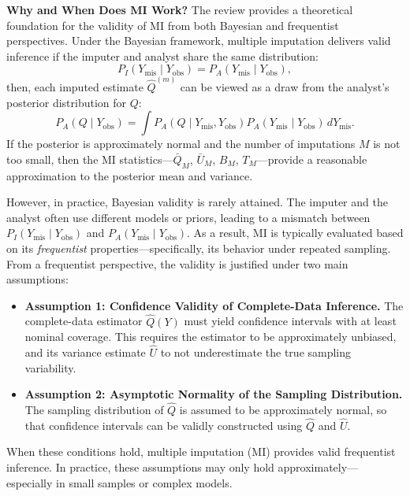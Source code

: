 \documentclass[12pt,oneside]{amsart}
\theoremstyle{definition}
\theoremstyle{remark}
\numberwithin{equation}{section}
\begin{document}
\textbf{Why and When Does MI Work?}  
The review provides a theoretical foundation for the validity of MI from both Bayesian and frequentist perspectives. Under the Bayesian framework, multiple imputation delivers valid inference if the imputer and analyst share the same distribution:
$$
P_I(Y_{\text{mis}} \mid Y_{\text{obs}}) = P_A(Y_{\text{mis}} \mid Y_{\text{obs}}),
$$
then, each imputed estimate $\hat{Q}^{(m)}$ can be viewed as a draw from the analyst’s posterior distribution for $Q$: $$
P_A(Q \mid Y_{\text{obs}}) = \int P_A(Q \mid Y_{\text{mis}}, Y_{\text{obs}}) P_A(Y_{\text{mis}} \mid Y_{\text{obs}}) \, dY_{\text{mis}}. 
$$
If the posterior is approximately normal and the number of imputations $M$ is not too small, then the MI statistics—$\bar{Q}_M$, $\bar{U}_M$, $B_M$, $T_M$—provide a reasonable approximation to the posterior mean and variance.  

However, in practice, Bayesian validity is rarely attained. The imputer and the analyst often use different models or priors, leading to a mismatch between $P_I(Y_{\text{mis}} \mid Y_{\text{obs}})$ and $P_A(Y_{\text{mis}} \mid Y_{\text{obs}})$. As a result, MI is typically evaluated based on its \textit{frequentist} properties—specifically, its behavior under repeated sampling. From a frequentist perspective, the validity is justified under two main assumptions:
\begin{itemize}
    \item \textbf{Assumption 1: Confidence Validity of Complete-Data Inference.} The complete-data estimator $\hat{Q}(Y)$ must yield confidence intervals with at least nominal coverage. This requires the estimator to be approximately unbiased, and its variance estimate $\hat{U}$ to not underestimate the true sampling variability.
    \item \textbf{Assumption 2: Asymptotic Normality of the Sampling Distribution.} The sampling distribution of $\hat{Q}$ is assumed to be approximately normal, so that confidence intervals can be validly constructed using $\hat{Q}$ and $\hat{U}$.
\end{itemize}
When these conditions hold, multiple imputation (MI) provides valid frequentist inference. In practice, these assumptions may only hold approximately—especially in small samples or complex models.
\end{document}
